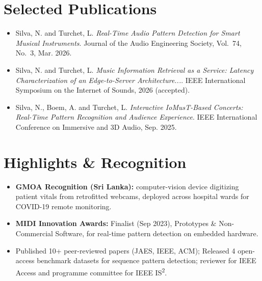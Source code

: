 \documentclass[11pt]{article}
\begin{document}

\vspace{-5pt}
\section*{Selected Publications \footnotesize {}}
\begin{itemize}[leftmargin=1.2em, itemsep=-0.25em]
    \item Silva, N. and Turchet, L. \textit{Real-Time Audio Pattern Detection for Smart Musical Instruments}. Journal of the Audio Engineering Society, Vol.~74, No.~3, Mar. 2026. 
    \item Silva, N. and Turchet, L. \textit{Music Information Retrieval as a Service: Latency Characterization of an Edge-to-Server Architecture...}. IEEE International Symposium on the Internet of Sounds, 2026 (accepted).
    \item Silva, N., Boem, A. and Turchet, L. \textit{Interactive IoMusT-Based Concerts: Real-Time Pattern Recognition and Audience Experience}. IEEE International Conference on Immersive and 3D Audio, Sep. 2025.
\end{itemize}

\vspace{-0.5em}
\section*{Highlights \& Recognition}
\begin{itemize}[leftmargin=1.2em, itemsep=-0.25em]
    \item \textbf{GMOA Recognition (Sri Lanka):} computer-vision device digitizing patient vitals from retrofitted webcams, deployed across hospital wards for COVID-19 remote monitoring.
    \item \textbf{MIDI Innovation Awards:} Finalist (Sep 2023), Prototypes \& Non-Commercial Software, for real-time pattern detection on embedded hardware.
    \item Published 10+ peer-reviewed papers (JAES, IEEE, ACM); Released 4 open-access benchmark datasets for sequence pattern detection; reviewer for IEEE Access and programme committee for IEEE IS\textsuperscript{2}.
    
\end{itemize}
\end{document}
